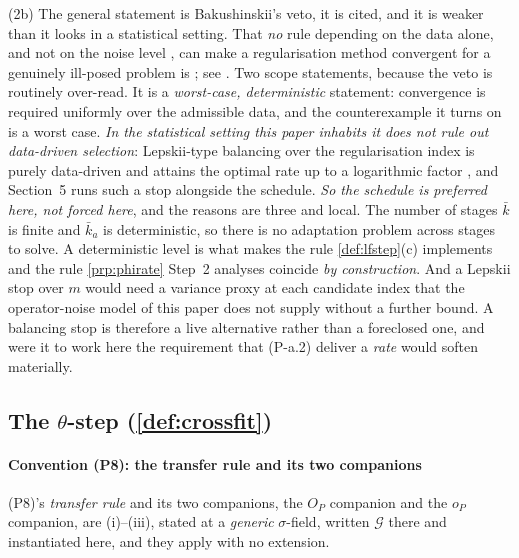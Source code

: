 (2b) The general statement is Bakushinskii's veto, it is cited, and it is weaker than it looks in
a statistical setting. That \emph{no} rule depending on the data alone, and not on the noise level
, can make a regularisation method convergent for a genuinely ill-posed problem is
\citet{bakushinskii1984}; see \citet[\S3.3]{engl2000}. Two scope statements, because the veto is
routinely over-read. It is a \emph{worst-case, deterministic}
statement: convergence is required uniformly over the admissible data, and the counterexample it turns
on is a worst case. \emph{In the statistical setting this paper inhabits it does not rule out
data-driven selection}: Lepskii-type balancing over the regularisation index is purely data-driven and
attains the optimal rate up to a logarithmic factor \citep{lepskii1990}, and Section~5 runs such a
stop alongside the schedule. \emph{So the schedule is preferred here, not forced here}, and the reasons are three and
local. The number of stages $\bar k$ is finite and $\bar k_a$ is deterministic, so there is no
adaptation problem across stages to solve. A deterministic level is what makes the rule
\cref{def:lfstep}(c) implements and the rule \cref{prp:phirate} Step~2 analyses coincide \emph{by
construction}. And a Lepskii stop over $m$ would
need a variance proxy at each candidate index that the operator-noise model of this paper does not
supply without a further bound. A balancing stop is therefore a live alternative rather than a
foreclosed one, and were it to work here the requirement that (P-a.2) deliver a \emph{rate} would
soften materially.


\subsection*{The $\theta$-step (\cref{def:crossfit})}

\paragraph{Convention \textup{(P8)}: the transfer rule and its two companions}

\textup{(P8)}'s \emph{transfer rule} and
its two companions, the $O_P$ companion and the $o_P$ companion, are (i)--(iii),
stated at a \emph{generic} $\sigma$-field, written $\mathcal G$ there and instantiated here, and they apply
with no extension.

